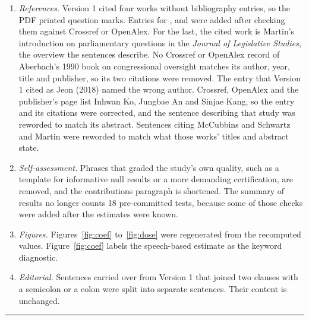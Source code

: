 \documentclass[11pt]{article}
\begin{document}
\begin{enumerate}
\item \textit{References.} Version 1 cited four works without bibliography entries, so the PDF printed question marks. Entries for \citet{mayhew1974}, \citet{mccubbins1984} and \citet{martin2011} were added after checking them against Crossref or OpenAlex. For the last, the cited work is Martin's introduction on parliamentary questions in the \textit{Journal of Legislative Studies}, the overview the sentences describe. No Crossref or OpenAlex record of Aberbach's 1990 book on congressional oversight matches its author, year, title and publisher, so its two citations were removed. The entry that Version 1 cited as Jeon (2018) named the wrong author. Crossref, OpenAlex and the publisher's page list Inhwan Ko, Jungbae An and Sinjae Kang, so the entry and its citations were corrected, and the sentence describing that study was reworded to match its abstract. Sentences citing McCubbins and Schwartz and Martin were reworded to match what those works' titles and abstract state.
\item \textit{Self-assessment.} Phrases that graded the study's own quality, such as a template for informative null results or a more demanding certification, are removed, and the contributions paragraph is shortened. The summary of results no longer counts 18 pre-committed tests, because some of those checks were added after the estimates were known.
\item \textit{Figures.} Figures~\ref{fig:coef} to~\ref{fig:dose} were regenerated from the recomputed values. Figure~\ref{fig:coef} labels the speech-based estimate as the keyword diagnostic.
\item \textit{Editorial.} Sentences carried over from Version 1 that joined two clauses with a semicolon or a colon were split into separate sentences. Their content is unchanged.
\end{enumerate}
\par
\endgroup
\noindent\rule{\textwidth}{0.4pt}
\end{document}
